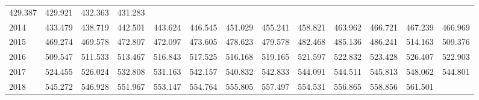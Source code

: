 \begin{tabular}{lllllllllllll}
  \multicolumn{1}{r}{429.387} &
  \multicolumn{1}{r}{429.921} &
  \multicolumn{1}{r}{432.363} &
  \multicolumn{1}{r}{431.283} \\
\multicolumn{1}{l}{\hspace{1em}2014} &
  \multicolumn{1}{|r}{433.479} &
  \multicolumn{1}{r}{438.719} &
  \multicolumn{1}{r}{442.501} &
  \multicolumn{1}{r}{443.624} &
  \multicolumn{1}{r}{446.545} &
  \multicolumn{1}{r}{451.029} &
  \multicolumn{1}{r}{455.241} &
  \multicolumn{1}{r}{458.821} &
  \multicolumn{1}{r}{463.962} &
  \multicolumn{1}{r}{466.721} &
  \multicolumn{1}{r}{467.239} &
  \multicolumn{1}{r}{466.969} \\
\multicolumn{1}{l}{\hspace{1em}2015} &
  \multicolumn{1}{|r}{469.274} &
  \multicolumn{1}{r}{469.578} &
  \multicolumn{1}{r}{472.807} &
  \multicolumn{1}{r}{472.097} &
  \multicolumn{1}{r}{473.605} &
  \multicolumn{1}{r}{478.623} &
  \multicolumn{1}{r}{479.578} &
  \multicolumn{1}{r}{482.468} &
  \multicolumn{1}{r}{485.136} &
  \multicolumn{1}{r}{486.241} &
  \multicolumn{1}{r}{514.163} &
  \multicolumn{1}{r}{509.376} \\
\multicolumn{1}{l}{\hspace{1em}2016} &
  \multicolumn{1}{|r}{509.547} &
  \multicolumn{1}{r}{511.533} &
  \multicolumn{1}{r}{513.467} &
  \multicolumn{1}{r}{516.843} &
  \multicolumn{1}{r}{517.525} &
  \multicolumn{1}{r}{516.168} &
  \multicolumn{1}{r}{519.165} &
  \multicolumn{1}{r}{521.597} &
  \multicolumn{1}{r}{522.832} &
  \multicolumn{1}{r}{523.428} &
  \multicolumn{1}{r}{526.407} &
  \multicolumn{1}{r}{522.903} \\
\multicolumn{1}{l}{\hspace{1em}2017} &
  \multicolumn{1}{|r}{524.455} &
  \multicolumn{1}{r}{526.024} &
  \multicolumn{1}{r}{532.808} &
  \multicolumn{1}{r}{531.163} &
  \multicolumn{1}{r}{542.157} &
  \multicolumn{1}{r}{540.832} &
  \multicolumn{1}{r}{542.833} &
  \multicolumn{1}{r}{544.091} &
  \multicolumn{1}{r}{544.511} &
  \multicolumn{1}{r}{545.813} &
  \multicolumn{1}{r}{548.062} &
  \multicolumn{1}{r}{544.801} \\
\multicolumn{1}{l}{\hspace{1em}2018} &
  \multicolumn{1}{|r}{545.272} &
  \multicolumn{1}{r}{546.928} &
  \multicolumn{1}{r}{551.967} &
  \multicolumn{1}{r}{553.147} &
  \multicolumn{1}{r}{554.764} &
  \multicolumn{1}{r}{555.805} &
  \multicolumn{1}{r}{557.497} &
  \multicolumn{1}{r}{554.531} &
  \multicolumn{1}{r}{556.865} &
  \multicolumn{1}{r}{558.856} &
  \multicolumn{1}{r}{561.501} &

\end{tabular}
